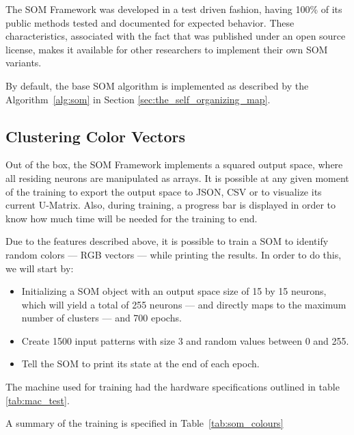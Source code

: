 The \ac{SOM} Framework was developed in a test driven fashion, having 100\% of its public methods tested and documented for expected behavior. These characteristics, associated with the fact that was published under an open source license, makes it available for other researchers to implement their own SOM variants.

By default, the base SOM algorithm is implemented as described by the Algorithm~\ref{alg:som} in Section \ref{sec:the_self_organizing_map}. 
\subsection{Clustering Color Vectors}
\label{sub:main_features}
Out of the box, the \ac{SOM} Framework implements a squared output space, where all residing neurons are manipulated as arrays. It is possible at any given moment of the training to export the output space to \ac{JSON}, \ac{CSV} or to visualize its current \ac{U-Matrix}. Also, during training, a progress bar is displayed in order to know how much time will be needed for the training to end.

Due to the features described above, it is possible to train a \ac{SOM} to identify random colors --- RGB vectors --- while printing the results. In order to do this, we will start by:
\begin{itemize}
  \item Initializing a SOM object with an output space size of 15 by 15 neurons, which will yield a total of 255 neurons --- and directly maps to the maximum number of clusters --- and 700 epochs.
  \item Create 1500 input patterns with size 3 and random values between 0 and 255. 
  \item Tell the SOM to print its state at the end of each epoch.
\end{itemize}
The machine used for training had the hardware specifications outlined in table \ref{tab:mac_test}.



A summary of the training is specified in Table~\ref{tab:som_colours}


